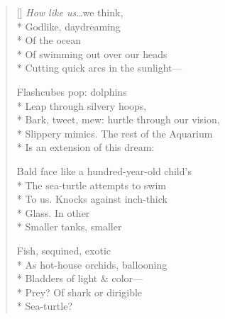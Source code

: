\label{ch:dolphins}
\settowidth{\versewidth}{Bark, tweet, mew: hurtle through our vision,}
\begin{verse}[\versewidth]
\textit{How like us}\ldots we think,\\*
Godlike, daydreaming\\*
Of the ocean\\*
Of swimming out over our heads\\*
Cutting quick arcs in the sunlight---

Flashcubes pop: dolphins\\*
Leap through silvery hoops,\\*
Bark, tweet, mew: hurtle through our vision,\\*
Slippery mimics. The rest of the Aquarium\\*
Is an extension of this dream:

Bald face like a hundred-year-old child's\\*
The sea-turtle attempts to swim\\*
To us. Knocks against inch-thick\\*
Glass.     In other\\*
Smaller tanks, smaller

Fish, sequined, exotic\\*
As hot-house orchids, ballooning\\*
Bladders of light \& color---\\*
Prey? Of shark or dirigible\\*
Sea-turtle?
\end{verse}
